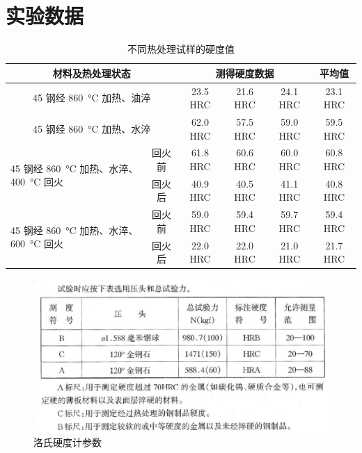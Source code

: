 \documentclass[a4paper,utf8]{article}
\begin{document}
\section{实验数据}
\begin{table}[!ht]\centering
    \caption{不同热处理试样的硬度值}
    \begin{tabular}{|m{12em}|c|*{4}{c|}}\hline
        \multicolumn{2}{|c|}{材料及热处理状态} & \multicolumn{3}{c|}{测得硬度数据} & 平均值 \bigstrut \\ \hline

        \multicolumn{2}{|c|}{45 钢经 \SI{860}{\degreeCelsius} 加热、油淬} & 23.5 HRC & 21.6 HRC & 24.1 HRC & 23.1 HRC \bigstrut \\ \hline

        \multicolumn{2}{|c|}{45 钢经 \SI{860}{\degreeCelsius} 加热、水淬} & 62.0 HRC & 57.5 HRC & 59.0 HRC & 59.5 HRC \bigstrut \\ \hline

        \multirow{2}{12em}{45 钢经 \SI{860}{\degreeCelsius} 加热、水淬、\SI{400}{\degreeCelsius} 回火} & 回火前 & 61.8 HRC & 60.6 HRC & 60.0 HRC & 60.8 HRC\bigstrut \\ \cline{2-6}
        & 回火后 & 40.9 HRC & 40.5 HRC & 41.1 HRC & 40.8 HRC \bigstrut \\ \hline

        \multirow{2}{12em}{45 钢经 \SI{860}{\degreeCelsius} 加热、水淬、\SI{600}{\degreeCelsius} 回火} & 回火前 & 59.0 HRC & 59.4 HRC & 59.7 HRC & 59.4 HRC \bigstrut \\ \cline{2-6}
        & 回火后 & 22.0 HRC & 22.0 HRC & 21.0 HRC & 21.7 HRC \bigstrut \\ \hline
    \end{tabular}
\end{table}
\begin{figure}[!ht]
    \caption{洛氏硬度计参数}
    \includegraphics[width=\textwidth]{yingdu.jpg}
\end{figure}\newpage
\end{document}
